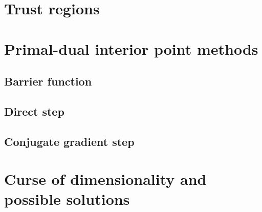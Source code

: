 \section{Trust regions}

\section{Primal-dual interior point methods}
\subsection{Barrier function}
\subsection{Direct step}
\subsection{Conjugate gradient step}

\section{Curse of dimensionality and possible solutions}